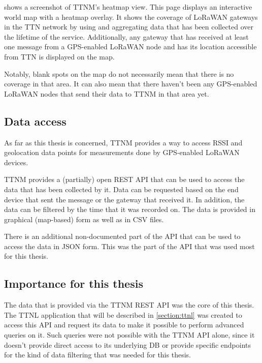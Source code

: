  shows a screenshot of \acl{TTNM}'s heatmap view.
This page displays an interactive world map with a heatmap overlay.
It shows the coverage of \ac{LoRaWAN} gateways in the \ac{TTN} network by using and aggregating data that has been collected over the lifetime of the service.
Additionally, any gateway that has received at least one message from a \ac{GPS}-enabled \ac{LoRaWAN} node and has its location accessible from \ac{TTN} is displayed on the map.

Notably, blank spots on the map do not necessarily mean that there is no coverage in that area.
It can also mean that there haven't been any \ac{GPS}-enabled \ac{LoRaWAN} nodes that send their data to \ac{TTNM} in that area yet.

\subsection{Data access}

As far as this thesis is concerned, \acl{TTNM} provides a way to access \ac{RSSI} and geolocation data points for measurements done by \ac{GPS}-enabled \ac{LoRaWAN} devices.

\ac{TTNM} provides a (partially) open \ac{REST} \ac{API} that can be used to access the data that has been collected by it.
Data can be requested based on the end device that sent the message or the gateway that received it.
In addition, the data can be filtered by the time that it was recorded on.
The data is provided in graphical (map-based) form as well as in \ac{CSV} files.

There is an additional non-documented part of the \ac{API} that can be used to access the data in \ac{JSON} form.
This was the part of the \ac{API} that was used most for this thesis.

\subsection{Importance for this thesis}\label{sec:ttn-mapper-importance}

The data that is provided via the \ac{TTNM} \ac{REST} \ac{API} was the core of this thesis.
The \ac{TTNL} application that will be described in \cref{section:ttnl} was created to access this \ac{API} and request its data to make it possible to perform advanced queries on it.
Such queries were not possible with the \ac{TTNM} \ac{API} alone, since it doesn't provide direct access to its underlying \ac{DB} or provide specific endpoints for the kind of data filtering that was needed for this thesis.

